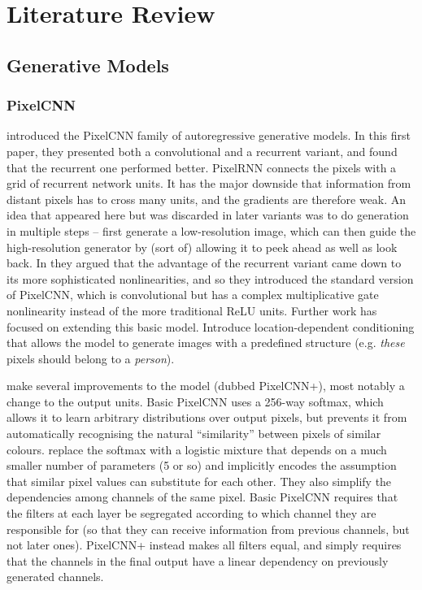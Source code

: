 \documentclass[10pt,a4paper]{article}
\newcommand{\nquote}[1]{``{#1}''}
\begin{document}
\section{Literature Review}

\subsection{Generative Models}

\subsubsection{PixelCNN}
\cite{pixelcnn1} introduced the PixelCNN family of autoregressive generative models. In this first paper, they presented both a convolutional and a recurrent variant, and found that the recurrent one performed better. PixelRNN connects the pixels with a grid of recurrent network units. It has the major downside that information from distant pixels has to cross many units, and the gradients are therefore weak. An idea that appeared here but was discarded in later variants was to do generation in multiple steps -- first generate a low-resolution image, which can then guide the high-resolution generator by (sort of) allowing it to peek ahead as well as look back. In \cite{pixelcnn2} they argued that the advantage of the recurrent variant came down to its more sophisticated nonlinearities, and so they introduced the standard version of PixelCNN, which is convolutional but has a complex multiplicative gate nonlinearity instead of the more traditional ReLU units. Further work has focused on extending this basic model. \cite{pixelcnn3} Introduce location-dependent conditioning that allows the model to generate images with a predefined structure (e.g. \emph{these} pixels should belong to a \emph{person}).

\cite{pixelcnn++} make several improvements to the model (dubbed PixelCNN+), most notably a change to the output units. Basic PixelCNN uses a 256-way softmax, which allows it to learn arbitrary distributions over output pixels, but prevents it from automatically recognising the natural \nquote{similarity} between pixels of similar colours. \cite{pixelcnn++} replace the softmax with a logistic mixture that depends on a much smaller number of parameters (5 or so) and implicitly encodes the assumption that similar pixel values can substitute for each other. They also simplify the dependencies among channels of the same pixel. Basic PixelCNN requires that the filters at each layer be segregated according to which channel they are responsible for (so that they can receive information from previous channels, but not later ones). PixelCNN+ instead makes all filters equal, and simply requires that the channels in the final output have a linear dependency on previously generated channels.
\end{document}
